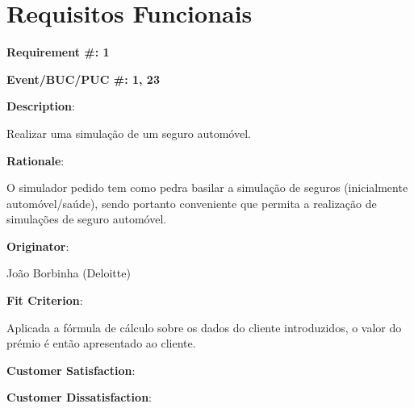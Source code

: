 \pagebreak
\section{Requisitos Funcionais}

\begin{minipage}{0.55\textwidth}
\begin{flushleft}\textbf{Requirement \#: 1}\end{flushleft}
\end{minipage}
\begin{minipage}{0.4\textwidth}
\begin{flushright}\textbf{Event/BUC/PUC \#: 1, 23}\end{flushright}
\end{minipage}

\begin{description}
\item \textbf{Description}:

Realizar uma simulação de um seguro automóvel.\\

\item \textbf{Rationale}:

O simulador pedido tem como pedra basilar a simulação de seguros (inicialmente automóvel/saúde), sendo portanto conveniente que permita a realização de simulações de seguro automóvel.\\

\item \textbf{Originator}:

João Borbinha (Deloitte)\\

\item \textbf{Fit Criterion}:

Aplicada a fórmula de cálculo sobre os dados do cliente introduzidos, o valor do prémio é então apresentado ao cliente.\\

\begin{minipage}{0.45\textwidth}
\begin{flushleft}\item \textbf{Customer Satisfaction}:\end{flushleft}
\end{minipage}
\begin{minipage}{0.45\textwidth}
\begin{flushleft}\item \textbf{Customer Dissatisfaction}:\end{flushleft}
\end{minipage}


\end{description}
